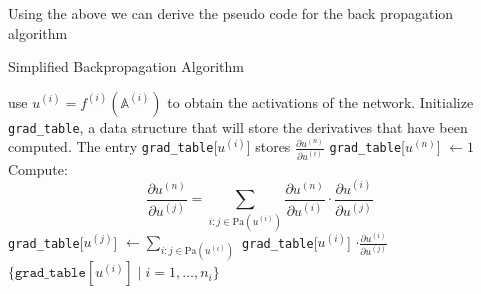 \documentclass[a4paper,12pt]{article}
\begin{document}
Using the above we can derive the pseudo code for the back propagation algorithm
\begin{algorithm}[H]
  \caption{Simplified Backpropagation Algorithm }\label{alg:simple-backprop}
  \begin{algorithmic}[1]
  \State use   $u^{(i)} = f^{(i)}(\mathbb{A}^{(i)})$ to obtain the activations of the network.
  \State Initialize \texttt{grad\_table}, a data structure that will store the derivatives that have been computed.
  \Statex \hspace{1.5em} The entry \texttt{grad\_table}[$u^{(i)}$] stores \( \frac{\partial u^{(n)}}{\partial u^{(i)}} \)
  \State \texttt{grad\_table}[$u^{(n)}$] $\gets 1$
    \Statex \hspace{1.5em} Compute:
    \[
      \frac{\partial u^{(n)}}{\partial u^{(j)}} = \sum_{i : j \in \mathrm{Pa}(u^{(i)})} \frac{\partial u^{(n)}}{\partial u^{(i)}} \cdot \frac{\partial u^{(i)}}{\partial u^{(j)}}
    \]
    \State \texttt{grad\_table}[$u^{(j)}$] $\gets \sum_{i : j \in \mathrm{Pa}(u^{(i)})}$ \texttt{grad\_table}[$u^{(i)}$] $\cdot \frac{\partial u^{(i)}}{\partial u^{(j)}}$
  \EndFor
  \State \Return $\{\texttt{grad\_table}[u^{(i)}] \mid i = 1, \dots, n_i\}$
  \end{algorithmic}
\end{algorithm}
\end{document}
